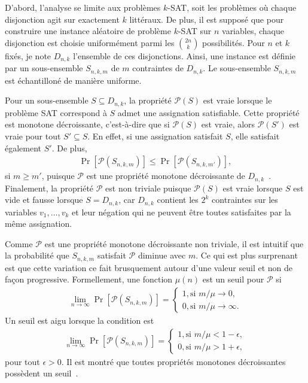D'abord,
l'analyse se limite aux problèmes $k$-SAT,
soit les problèmes où chaque disjonction agit sur exactement $k$ littéraux.
De plus,
il est supposé que pour construire une instance aléatoire de problème $k$-SAT sur $n$ variables,
chaque disjonction est choisie uniformément parmi les $\binom{2n}{k}$ possibilités.
Pour $n$ et $k$ fixés, je note $D_{n,k}$ l'ensemble de ces disjonctions.
Ainsi, une instance est définie par un sous-ensemble $S_{n,k,m}$ de $m$ contraintes de $D_{n, k}$.
Le sous-ensemble $S_{n, k, m}$ est échantilloné de manière uniforme. 

Pour un sous-ensemble $S \subseteq D_{n, k}$,
la propriété $\mathcal P(S)$ est vraie lorsque le problème SAT correspond à $S$
admet une assignation satisfiable.
Cette propriété est monotone décroissante,
c'est-à-dire que si $\mathcal P(S)$ est vraie,
alors $\mathcal P(S')$ est vraie pour tout $S' \subseteq S$.
En effet,
si une assignation satisfait $S$, elle satisfait également $S'$.
De plus,
\begin{align}
  \Pr[\mathcal P(S_{n, k, m})] \leq 
  \Pr[\mathcal P(S_{n, k, m'})],
\end{align}
si $m \geq m'$,
puisque $\mathcal P$ est une propriété monotone décroissante 
de $D_{n, k}$~\cite{bollobas_threshold_1987}.
Finalement, la propriété $\mathcal P$ est non triviale puisque
$\mathcal P(S)$ est vraie lorsque $S$ est vide et fausse lorsque $S = D_{n, k}$,
car $D_{n, k}$ contient les $2^k$ contraintes
sur les variables $v_1, \ldots, v_k$ et leur négation
qui ne peuvent être toutes satisfaites par la même assignation.

Comme $\mathcal P$ est une propriété monotone décroissante non triviale,
il est intuitif que la probabilité que $S_{n,k,m}$ satisfait 
$\mathcal P$ diminue avec $m$.
Ce qui est plus surprenant est que cette variation ce fait brusquement 
autour d'une valeur seuil et non de façon progressive.
Formellement,
une fonction $\mu(n)$ est un seuil pour $\mathcal P$ si 
\begin{align}
  \lim_{n \to \infty} \Pr[\mathcal P(S_{n,k,m})] 
  =
  \begin{cases}
    1, \text{si } m / \mu \to 0, \\
    0, \text{si } m / \mu \to \infty.
  \end{cases}
\end{align}
Un seuil est aigu lorsque la condition est 
\begin{align}
  \lim_{n \to \infty} \Pr[\mathcal P(S_{n,k,m})] 
  =
  \begin{cases}
    1, \text{si } m / \mu < 1 - \epsilon, \\
    0, \text{si } m / \mu > 1 + \epsilon,
  \end{cases}
\end{align}
pour tout $\epsilon > 0$.
Il est montré que toutes propriétés monotones décroissantes
possèdent un seuil~\cite{bollobas_threshold_1987}.

